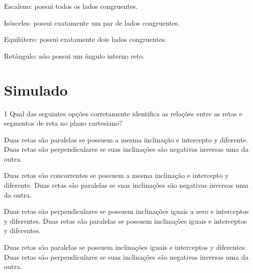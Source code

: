 \begin{escolha}
\item Escaleno: possui todos os lados congruentes.
\item Isósceles: possui exatamente um par de lados congruentes.
\item Equilátero: possui exatamente dois lados congruentes.
\item Retângulo: não possui um ângulo interno reto.
\end{escolha}



%




\chapter[Simulado 4]{Simulado}

\num{1}  Qual das seguintes opções corretamente identifica as relações entre
as retas e segmentos de reta no plano cartesiano?

\begin{escolha}
\item Duas retas são paralelas se possuem a mesma inclinação e intercepto y
diferente. Duas retas são perpendiculares se suas inclinações são
negativas inversas uma da outra.
\item Duas retas são concorrentes se possuem a mesma inclinação e
intercepto y diferente. Duas retas são paralelas se suas inclinações são
negativas inversas uma da outra.
\item Duas retas são perpendiculares se possuem inclinações iguais a zero e
interceptos y diferentes. Duas retas são paralelas se possuem
inclinações iguais e interceptos y diferentes.
\item Duas retas são paralelas se possuem inclinações iguais e interceptos
y diferentes. Duas retas são perpendiculares se suas inclinações são
negativas inversas uma da outra.
\end{escolha}

